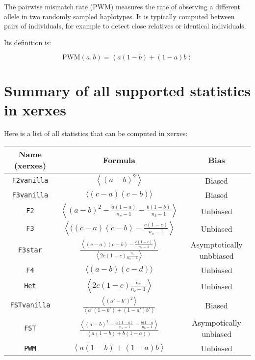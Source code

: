 \documentclass{article}
\begin{document}
The pairwise mismatch rate (PWM) measures the rate of observing a different allele in two randomly sampled haplotypes. It is typically computed between pairs of individuals, for example to detect close relatives or identical individuals. 

Its definition is:

$$\text{PWM}(a, b) = \left\langle a (1 - b) + (1 - a) b \right\rangle$$

\section{Summary of all supported statistics in xerxes}

Here is a list of all statistics that can be computed in xerxes:

\begin{center}
    \begin{tabular}{|c|c|c|}
        \hline
        \textbf{Name (xerxes)} & \textbf{Formula} & \textbf{Bias} \\
        \hline
        \hline
        \texttt{F2vanilla} & $\left\langle (a-b)^2\right\rangle$  & Biased \\
        \hline
        \texttt{F3vanilla} & $\langle (c-a)(c-b) \rangle$ & Biased \\
        \hline
        \texttt{F2} & $\left\langle (a-b)^2-\frac{a(1-a)}{n_a-1}-\frac{b(1-b)}{n_b-1}\right\rangle$  & Unbiased \\
        \hline
        \texttt{F3} & $\left\langle( (c-a)(c-b)-\frac{c(1-c)}{n_c-1}\right\rangle$  & Unbiased \\
        \hline
        \texttt{F3star} & $\frac{\left\langle (c-a)(c-b)-\frac{c(1-c)}{n_c-1}\right\rangle}{\left\langle 2 c(1-c )\frac{n_c}{n_c-1}\right\rangle}$ & Asymptotically unbbiased \\
        \hline
        \texttt{F4} & $\langle (a-b)(c-d) \rangle$  & Unbiased \\
        \hline
        \texttt{Het} & $\left\langle 2 c(1-c )\frac{n_c}{n_c-1}\right\rangle$  & Unbiased \\
        \hline
        \texttt{FSTvanilla} & $\frac{\left\langle(a'-b')^2\right\rangle}{\left\langle a'(1-b')+(1-a') b'\right\rangle}$  & Biased  \\
        \hline
        \texttt{FST} & $\frac{\left\langle\left(a-b\right)^2-\frac{a(1-a)}{n_a-1} - \frac{b(1-a}{n_b-1}\right\rangle}{\left\langle a(1-b) + b(1-a)\right\rangle}$  & Asympotically unbiased \\
        \hline
        \texttt{PWM} & $\left\langle a (1 - b) + (1 - a) b \right\rangle$  & Unbiased \\
        \hline
    \end{tabular}
\end{center}
\end{document}
